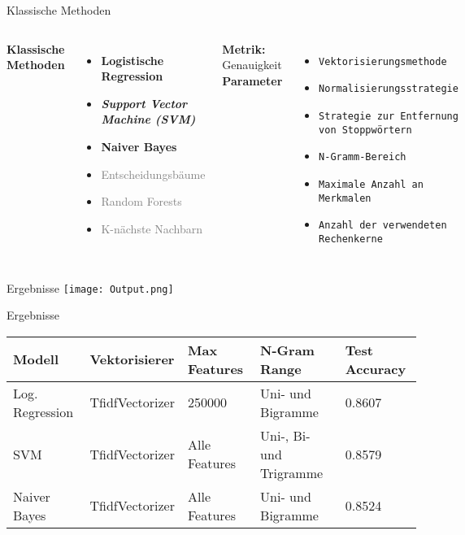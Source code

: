 \documentclass[aspectratio=169]{beamer} %
\begin{document}
\begin{frame}{Klassische Methoden}
  \fontsize{10pt}{12pt}\selectfont
  \vspace{0.3cm}

  \begin{columns}
      \textbf{Klassische Methoden}
      \vspace{0.3cm}
      \begin{itemize}
          \item \textbf{Logistische Regression}
          \item \textbf{\textit{Support Vector Machine (SVM)}}
          \item \textbf{Naiver Bayes}
          \item \textcolor{gray}{Entscheidungsbäume}
          \item \textcolor{gray}{Random Forests}
          \item \textcolor{gray}{K-nächste Nachbarn}
      \end{itemize}
      \vspace{0.5cm}
  \textbf{Metrik:} Genauigkeit
    \vspace{-0.5cm}
      \textbf{Parameter}
      \vspace{0.3cm}
      \begin{itemize}
    \item \texttt{Vektorisierungsmethode}
    \item \texttt{Normalisierungsstrategie}
    \item \texttt{Strategie zur Entfernung von Stoppwörtern}
    \item \texttt{N-Gramm-Bereich}
    \item \texttt{Maximale Anzahl an Merkmalen}
    \item \texttt{Anzahl der verwendeten Rechenkerne}
\end{itemize}
  \end{columns}
\end{frame}

\begin{frame}{Ergebnisse}
    \centering
    \texttt{[image: Output.png]}
\end{frame}

\begin{frame}{Ergebnisse}
    \centering
    \scriptsize
    \begin{tabular}{|l|l|l|l|l|}
        \hline
        \textbf{Modell} & \textbf{Vektorisierer} & \textbf{Max Features} & \textbf{N-Gram Range} & \textbf{Test Accuracy} \\
        \hline
        Log. Regression & TfidfVectorizer & 250000 & Uni- und Bigramme & 0.8607 \\
        SVM & TfidfVectorizer & Alle Features & Uni-, Bi- und Trigramme & 0.8579 \\
        Naiver Bayes & TfidfVectorizer & Alle Features & Uni- und Bigramme & 0.8524 \\
        \hline
    \end{tabular}
\end{frame}
\end{document}
